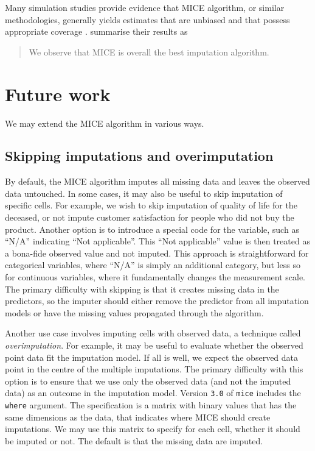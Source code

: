 \documentclass[
]{book}
\begin{document}
Many simulation studies provide evidence that MICE algorithm, or similar methodologies, generally yields estimates that are unbiased and that possess appropriate coverage \citep{BRAND1999, RAGHUNATHAN2001, BRAND2003, TANG2005, VANBUUREN2006, HORTON2007, YU2007}. \citet{NAIR2013} summarise their results as

\begin{quote}
We observe that MICE is overall the best imputation algorithm.
\end{quote}

\section{Future work}\label{future-work}

We may extend the MICE algorithm in various ways.

\subsection{Skipping imputations and overimputation}\label{skipping-imputations-and-overimputation}

By default, the MICE algorithm imputes all missing data and leaves the observed data untouched. In some cases, it may also be useful to skip imputation of specific cells. For example, we wish to skip imputation of quality of life for the deceased, or not impute customer satisfaction for people who did not buy the product. Another option is to introduce a special code for the variable, such as ``N/A'' indicating ``Not applicable''. This ``Not applicable'' value is then treated as a bona-fide observed value and not imputed. This approach is straightforward for categorical variables, where ``N/A'' is simply an additional category, but less so for continuous variables, where it fundamentally changes the measurement scale. The primary difficulty with skipping is that it creates missing data in the predictors, so the imputer should either remove the predictor from all imputation models or have the missing values propagated through the algorithm.

Another use case involves imputing cells with observed data, a technique called \emph{overimputation}. For example, it may be useful to evaluate whether the observed point data fit the imputation model. If all is well, we expect the observed data point in the centre of the multiple imputations. The primary difficulty with this option is to ensure that we use only the observed data (and not the imputed data) as an outcome in the imputation model. Version \texttt{3.0} of \texttt{mice} includes the \texttt{where} argument. The specification is a matrix with binary values that has the same dimensions as the data, that indicates where MICE should create imputations. We may use this matrix to specify for each cell, whether it should be imputed or not. The default is that the missing data are imputed.
\end{document}
